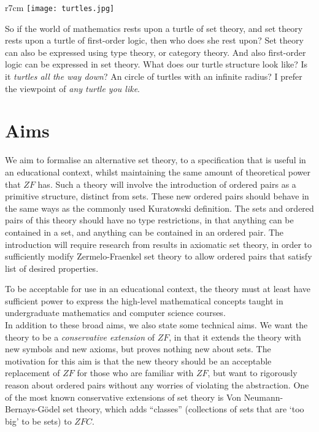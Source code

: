 \documentclass[11pt]{report}
\theoremstyle{definition}
\theoremstyle{theorem}
\theoremstyle{lemma}
\begin{document}
\begin{wrapfigure}{r}{7cm}
\centering
\texttt{[image: turtles.jpg]}
\end{wrapfigure}
\noindent
So if the world of mathematics rests upon a turtle of set theory, and set theory rests upon a turtle of first-order logic, then who does she rest upon? 
Set theory can also be expressed using type theory, or category theory. And also first-order logic can be expressed in set theory.
What does our turtle structure look like? 
Is it \emph{turtles all the way down}? 
An circle of turtles with an infinite radius?
I prefer the viewpoint of \emph{any turtle you like}. 
\clearpage
\section{Aims}
We aim to formalise an alternative set theory, to a specification that is useful in an educational context, whilst maintaining the same amount of theoretical power that $\mathit{ZF}$ has.
Such a theory will involve the introduction of ordered pairs as a primitive structure, distinct from sets.
These new ordered pairs should behave in the same ways as the commonly used Kuratowski definition.
The sets and ordered pairs of this theory should have no type restrictions, in that anything can be contained in a set, and anything can be contained in an ordered pair.
The introduction will require research from results in axiomatic set theory, in order to sufficiently modify Zermelo-Fraenkel set theory to allow ordered pairs that satisfy list of desired properties.

To be acceptable for use in an educational context, the theory must at least have sufficient power to express the high-level mathematical concepts taught in undergraduate mathematics and computer science courses.\\

In addition to these broad aims, we also state some technical aims. 
We want the theory to be a \emph{conservative extension} of $\mathit{ZF}$, in that it extends the theory with new symbols and new axioms, but proves nothing new about sets.
The motivation for this aim is that the new theory should be an acceptable replacement of $\mathit{ZF}$ for those who are familiar with $\mathit{ZF}$, but want to rigorously reason about ordered pairs without any worries of violating the abstraction.
One of the most known conservative extensions of set theory is Von Neumann-Bernays-G\"odel set theory, which adds ``classes'' (collections of sets that are `too big' to be sets) to $\mathit{ZFC}$. 
\end{document}
